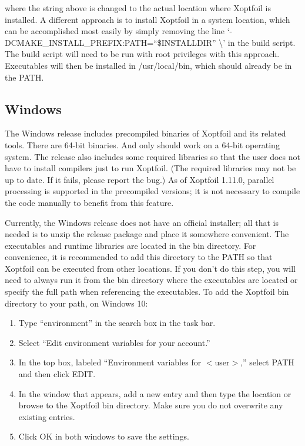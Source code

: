 \documentclass[11pt]{article}
\begin{document}
\noindent where the string above is changed to the actual location where Xoptfoil is
installed. A different approach is to install Xoptfoil in a system location, which can be
accomplished most easily by simply removing the line
`-DCMAKE\_INSTALL\_PREFIX:PATH=``\$INSTALLDIR'' \textbackslash' in the build script. The
build script will need to be run with root privileges with this approach. Executables will
then be installed in /usr/local/bin, which should already be in the PATH.

\subsection{Windows}\label{sec:install_windows}

The Windows release includes precompiled binaries of Xoptfoil and its related tools. There
are 64-bit binaries. And only should work on a 64-bit operating system.  The release also
includes some required libraries so that the user does not have to install compilers just
to run Xoptfoil. (The required libraries may not be up to date. If it fails, please report the bug.)
As of Xoptfoil 1.11.0, parallel processing is supported in the
precompiled versions; it is not necessary to compile the code manually to benefit from
this feature.

Currently, the Windows release does not have an official installer; all that is needed is
to unzip the release package and place it somewhere convenient. The executables and
runtime libraries are located in the bin directory. For convenience, it is recommended to
add this directory to the PATH so that Xoptfoil can be executed from other locations. If
you don't do this step, you will need to always run it from the bin directory where the
executables are located or specify the full path when referencing the executables.
To add the Xoptfoil bin directory to your path, on Windows 10:

\begin{enumerate}
  \item{Type ``environment'' in the search box in the task bar.}
  \item{Select ``Edit environment variables for your account.''}
  \item{In the top box, labeled ``Environment variables for $<$user$>$,'' select PATH and
then click EDIT.}
  \item{In the window that appears, add a new entry and then type the location or browse to
the Xoptfoil bin directory. Make sure you do not overwrite any existing entries.}
  \item{Click OK in both windows to save the settings.}
\end{enumerate}
\end{document}
